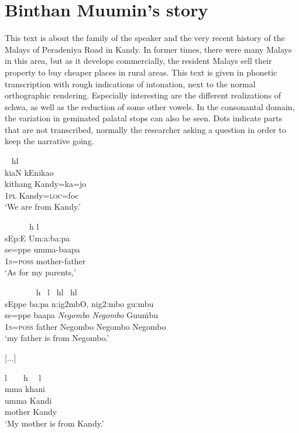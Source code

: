 \section*{Binthan Muumin's story}
This text is about the family of the speaker and the very recent history of the Malays of Peradeniya Road in Kandy. In former times, there were many Malays in this area, but as it develops commercially, the resident Malays sell their property to buy cheaper places in rural areas. This text is given in phonetic transcription with rough indications of intonation, next to the normal orthographic rendering. Especially interesting are the different realizations of schwa, as well as the reduction of some other vowels. In the consonantal domain, the variation in geminated palatal stops can also be seen. Dots indicate parts that are not transcribed, normally the researcher asking a question in order to keep the narrative going.

\let\eachwordone=\sc \let\eachwordtwo=\tipaencoding \let\eachwordthree=\it

\ea \label{K051222nar04.6}
\gllll  ~  h\hspace{1.3cm}l\\
 ki\dentt aN kEn\postalvd ika\J o\\
 kithang  Kandy=ka=jo\\
 \textsc{1pl} Kandy=\textsc{loc}=foc\\
 `We are from Kandy.'
\z


\ea \label{K051222nar04.7}
\gllll ~~~~~~h  \hspace{2cm}l\\
 sEp:E Um:a:ba:pa\\
 se=ppe umma-baapa\\
 \textsc{1s=poss} mother-father\\
 `As for my parents,'
\z


\ea \label{K051222nar04.8}
\gllll ~ ~~~~~~h ~\hspace{1.2cm}l ~h\hspace{1.1cm}l ~h\hspace{0.8cm}l \\
 sEppe ba:pa n:ig2mbO, nig2:mbo gu:mbu\\
 se=ppe baapa {\em Negombo} {\em Negombo} Guu\u mbu \\
 \textsc{1s=poss} father Negombo Negombo Negombo \\
 `my father is from Negombo.'
\z

[...]

\ea \label{K051222nar04.13}
\gllll l~~~~h ~~\hspace{.7cm}l\\
 \s mma k\super han\postalvd i\\
 umma Kandi\\
 mother Kandy\\
`My mother is from Kandy.'
\z


